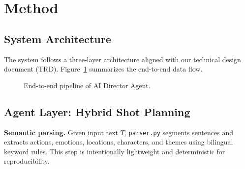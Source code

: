 \documentclass{article}
\begin{document}
\section{Method}
\label{sec:method}

\subsection{System Architecture}
The system follows a three-layer architecture aligned with our technical design document (TRD).
Figure~\ref{fig:pipeline} summarizes the end-to-end data flow.

\begin{figure}[t]
\centering
{}
\caption{End-to-end pipeline of AI Director Agent.}
\label{fig:pipeline}
\end{figure}

\subsection{Agent Layer: Hybrid Shot Planning}

\textbf{Semantic parsing.}
Given input text $T$, \texttt{parser.py} segments sentences and extracts actions, emotions, locations, characters, and themes using bilingual keyword rules.
This step is intentionally lightweight and deterministic for reproducibility.
\end{document}
